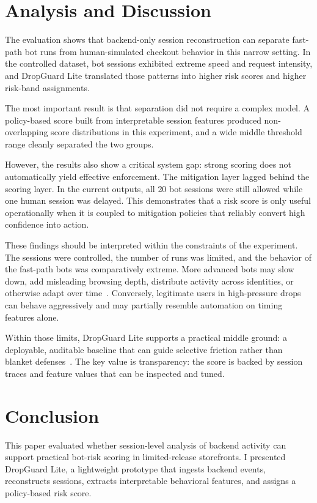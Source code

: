 \documentclass[12pt]{article}
\begin{document}
\section{Analysis and Discussion}
The evaluation shows that backend-only session reconstruction can separate fast-path bot runs from human-simulated checkout behavior in this narrow setting. In the controlled dataset, bot sessions exhibited extreme speed and request intensity, and DropGuard Lite translated those patterns into higher risk scores and higher risk-band assignments.

The most important result is that separation did not require a complex model. A policy-based score built from interpretable session features produced non-overlapping score distributions in this experiment, and a wide middle threshold range cleanly separated the two groups.

However, the results also show a critical system gap: strong scoring does not automatically yield effective enforcement. The mitigation layer lagged behind the scoring layer. In the current outputs, all 20 bot sessions were still allowed while one human session was delayed. This demonstrates that a risk score is only useful operationally when it is coupled to mitigation policies that reliably convert high confidence into action.

These findings should be interpreted within the constraints of the experiment. The sessions were controlled, the number of runs was limited, and the behavior of the fast-path bots was comparatively extreme. More advanced bots may slow down, add misleading browsing depth, distribute activity across identities, or otherwise adapt over time~\cite{10.1145/3538969.3538994}. Conversely, legitimate users in high-pressure drops can behave aggressively and may partially resemble automation on timing features alone.

Within those limits, DropGuard Lite supports a practical middle ground: a deployable, auditable baseline that can guide selective friction rather than blanket defenses~\cite{10.1145/3672608.3707741}. The key value is transparency: the score is backed by session traces and feature values that can be inspected and tuned.

\section{Conclusion}

This paper evaluated whether session-level analysis of backend activity can support practical bot-risk scoring in limited-release storefronts. I presented DropGuard Lite, a lightweight prototype that ingests backend events, reconstructs sessions, extracts interpretable behavioral features, and assigns a policy-based risk score.
\end{document}
